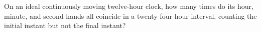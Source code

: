 On an ideal continuously moving twelve-hour clock, how many times do its hour, minute, and second hands all coincide in a twenty-four-hour interval, counting the initial instant but not the final instant?

